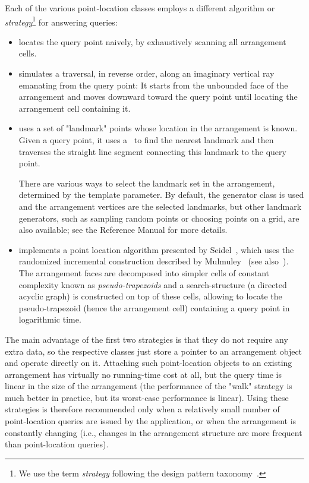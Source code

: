 Each of the various point-location classes employs a different
algorithm or {\em strategy}\footnote{We use the term {\em strategy}
following the design pattern taxonomy~\cite{cgal:ghjv-dpero-95}.}
for answering queries:
\begin{itemize}
\item {} locates the query
point naively, by exhaustively scanning all arrangement cells.
%
\item {}
simulates a traversal, in reverse order, along an imaginary vertical
ray emanating
from the query point: It starts from the unbounded face of the
arrangement and moves downward toward the query point until
locating the arrangement cell containing it.
%
\item {}
uses a set of "landmark" points whose location in the
arrangement is known. Given a query point, it uses a \kdtree\ to
find the nearest landmark and then traverses the straight line
segment connecting this landmark to the query point.

There are various ways to select the landmark set in the
arrangement, determined by the  template parameter.
By default, the generator
class  is used and the
arrangement vertices are the selected landmarks, but other
landmark generators, such as sampling random points or
choosing points on a grid, are also available; see the
Reference Manual for more details.
%
\item {} implements
a point location algorithm presented by Seidel~\cite{s-sfira-91}, which uses the 
randomized incremental construction described by Mulmuley~\cite{m-fppa-90} (see
also~\cite[Chapter~6]{bkos-cgaa-00}). The
arrangement faces are decomposed into simpler cells of constant
complexity known as {\em pseudo-trapezoids} and a search-structure
(a directed acyclic graph) is constructed on top of these cells,
allowing to locate the pseudo-trapezoid (hence the arrangement
cell) containing a query point in logarithmic time.
\end{itemize}

The main advantage of the first two strategies is that they do not
require any extra data, so the respective classes just store a
pointer to an arrangement object and operate directly on it.
Attaching such point-location objects to an existing arrangement
has virtually no running-time cost at all, but the query time is
linear in the size of the arrangement (the performance of the
"walk" strategy is much better in practice, but its worst-case
performance is linear). Using these strategies is therefore
recommended only when a relatively small number of point-location
queries are issued by the application, or when the arrangement is
constantly changing (i.e., changes in the arrangement structure
are more frequent than point-location queries).

